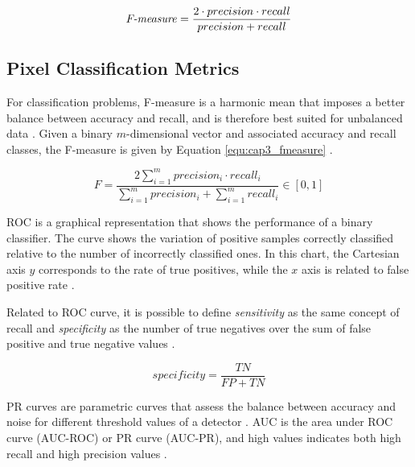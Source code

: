 \begin{equation}
  \text{\textit{F-measure}} = \frac{2 \cdot precision \cdot recall}{precision + recall}
  \label{equ:cap3_f_measure}
\end{equation}

\subsection{Pixel Classification Metrics}
\label{cap3_metricas_pixels}

For classification problems, F-measure is a harmonic mean that imposes a better balance between accuracy and recall, and is therefore best suited for unbalanced data \cite{DavisGoadrich:2006}. 
Given a binary $m$-dimensional vector and associated accuracy and recall classes, the F-measure is given by Equation \ref{equ:cap3_fmeasure} \cite{DavisGoadrich:2006}.

\begin{equation}
 F=\frac{ 2 \sum\limits_{i=1}^m {precision_i \cdot recall_i}}{ \sum\limits_{i=1}^m {precision_i} + \sum\limits_{i=1}^m {recall_i}}  \in [0,1] 
 \label{equ:cap3_fmeasure}
\end{equation}

\ac{ROC} is a graphical representation that shows the performance of a binary classifier.
The curve shows the variation of positive samples correctly classified relative to the number of incorrectly classified ones.
In this chart, the Cartesian axis $y$ corresponds to the rate of true positives, while the $x$ axis is related to false positive rate \cite{Fawcett:2006}.

Related to \ac{ROC} curve, it is possible to define \textit{sensitivity} as the same concept of recall and \textit{specificity} as the number of true negatives over the sum of false positive and true negative values \cite{Fawcett:2006}.

\begin{equation}
  specificity  = \frac{TN}{FP + TN}
  \label{equ:cap3_specificity}
\end{equation}

\ac{PR} curves are parametric curves that assess the balance between accuracy and noise for different threshold values of a detector \cite{MARTIN:1273918}.
\ac{AUC} is the area under \ac{ROC} curve (\ac{AUC}-ROC) or \ac{PR} curve (\ac{AUC}-PR), and high values indicates both high recall and high precision values \cite{DavisGoadrich:2006} \cite{Sofaer:2019}. 

